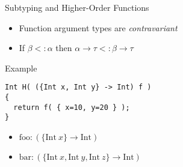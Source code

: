 \documentclass{beamer}
\newcommand{\arr}{\rightarrow}
\begin{document}
\begin{frame}[fragile]{Subtyping and Higher-Order Functions}

\onslide<+->
\begin{itemize}
  \item Function argument types are \emph{contravariant}
  \item If $\beta <: \alpha$ then $\alpha \arr \tau <: \beta \arr \tau$
\end{itemize}

\onslide<+->

Example

\begin{verbatim}
Int H( ({Int x, Int y} -> Int) f )
{
  return f( { x=10, y=20 } );
}
\end{verbatim}

\begin{itemize}
  \item $\text{foo} : (\{\text{Int}\ x\} \arr \text{Int})$
  \item $\text{bar} : (\{\text{Int}\ x, \text{Int}\ y, \text{Int}\ z\} \arr \text{Int})$
\end{itemize}

\end{frame}
\end{document}
